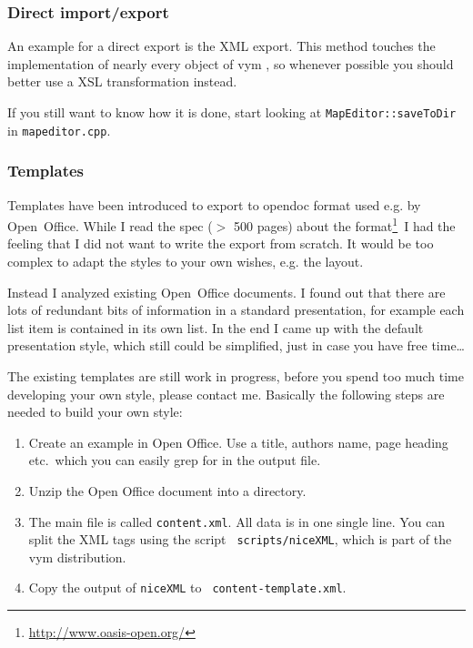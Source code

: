 \documentclass[12pt,a4paper]{article}
\newcommand{\vym}{{\sc vym }}
\begin{document}
\begin{appendix}
\subsubsection*{Direct import/export}
An example for a direct export is the XML export. This method touches
the implementation of nearly every object of \vym, so whenever possible
you should better use a XSL transformation instead.

If you still want to know how it is done, start looking at 
{\tt MapEditor::saveToDir} in {\tt mapeditor.cpp}.

\subsubsection*{Templates}
Templates have been introduced to export to opendoc format used e.g. by
Open~Office. While I read the spec ($>$ 500 pages) about the format\footnote{
\href{http://www.oasis-open.org/}{http://www.oasis-open.org/}}\ 
I had the feeling that I did not want to write the export from scratch. 
It would be too complex to adapt the styles to your own wishes, e.g. the
layout.

Instead I analyzed existing Open~Office documents. I found out that
there are lots of redundant bits of information in a standard
presentation, for example each list item is contained in its own list.
In the end I came up with the default presentation style, which still
could be simplified, just in case you have free time\ldots

The existing templates are still work in progress, before you spend too
much time developing your own style, please contact me.  Basically the
following steps are needed to build your own style:
\begin{enumerate}
    \item Create an example in Open Office. Use a title, authors name,
    page heading etc.\ which you can easily grep for in the output file.
    
    \item Unzip  the Open Office document into a directory.

    \item The main file is called {\tt content.xml}. All data is in one
    single line. You can split the XML tags using the script {\tt
    scripts/niceXML}, which is part of the \vym distribution.

    \item Copy the output of {\tt niceXML} to {\tt
    content-template.xml}.


\end{enumerate}
\end{appendix}
\end{document}
